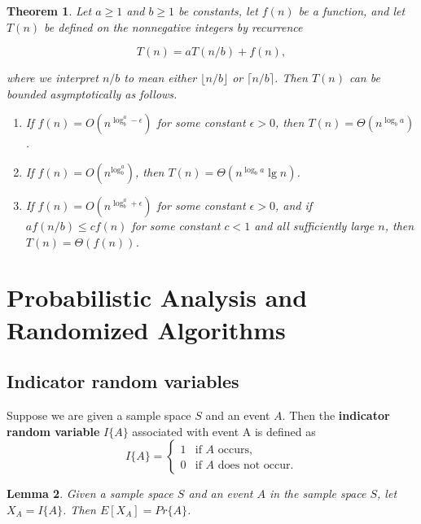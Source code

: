 \documentclass[12pt]{article}
\newtheorem{theorem}{Theorem}
\newtheorem{lemma}[theorem]{Lemma}
\begin{document}
\begin{theorem}
  Let $a \ge 1$ and $b \ge 1$ be constants, let $f(n)$ be a function, and let $T(n)$ be defined on the nonnegative integers by recurrence

  \begin{equation*}
    T(n) = aT(n/b) + f(n),
  \end{equation*}

  where we interpret $n/b$ to mean either $\lfloor n/b \rfloor$ or $\lceil n/b \rceil$. Then $T(n)$ can be bounded asymptotically as follows.

  \begin{enumerate}
  \item If $f(n) = O(n^{\log_b^a - \epsilon})$ for some constant $\epsilon > 0$, then $T(n) = \Theta (n^{\log_b a})$.
  \item If $f(n) = O(n^{\log_b^a})$, then $T(n) = \Theta (n^{\log_b a} \lg n)$.
  \item If $f(n) = O(n^{\log_b^a + \epsilon})$ for some constant $\epsilon > 0$, and if $af(n/b) \le cf(n)$ for some constant $c < 1$ and all sufficiently large $n$, then $T(n) = \Theta \left( f(n) \right)$.
  \end{enumerate}

\end{theorem}

\section{Probabilistic Analysis and Randomized Algorithms}

\subsection{Indicator random variables}

Suppose we are given a sample space $S$ and an event $A$. Then the \textbf {indicator random variable} $I\{A\}$ associated with event A is defined as
\begin{equation*}
  I\{A\} =
  \begin{cases}
    1 & \text{if $A$ occurs,} \\
    0 & \text{if $A$ does not occur.}
  \end{cases}
\end{equation*}

\begin{lemma}
  Given a sample space $S$ and an event $A$ in the sample space $S$, let $X_A = I\{ A \}$. Then $E[X_A] = Pr \{ A \}$.
\end{lemma}
\end{document}

